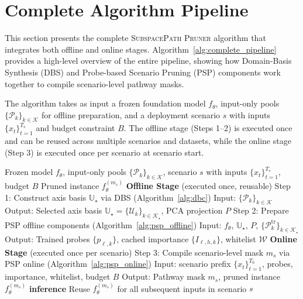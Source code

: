 \section{Complete Algorithm Pipeline}
\label{app:complete_pipeline}

This section presents the complete \textsc{SubspacePath Pruner} algorithm that integrates both offline and online stages.
Algorithm~\ref{alg:complete_pipeline} provides a high-level overview of the entire pipeline, showing how Domain-Basis Synthesis (DBS) and Probe-based Scenario Pruning (PSP) components work together to compile scenario-level pathway masks.

The algorithm takes as input a frozen foundation model $f_\theta$, input-only pools $\{\mathcal{P}_k\}_{k\in\mathcal{K}}$ for offline preparation, and a deployment scenario $s$ with inputs $\{x_t\}_{t=1}^{T_s}$ and budget constraint $B$.
The offline stage (Steps 1--2) is executed once and can be reused across multiple scenarios and datasets, while the online stage (Step 3) is executed once per scenario at scenario start.

\begin{algorithm*}[!b]
\caption{SubspacePath Pruner: Complete Pipeline}
\label{alg:complete_pipeline}
\begin{algorithmic}[1]
\REQUIRE Frozen model $f_\theta$, input-only pools $\{\mathcal{P}_k\}_{k\in\mathcal{K}}$, scenario $s$ with inputs $\{x_t\}_{t=1}^{T_s}$, budget $B$
\ENSURE Pruned instance $f_{\theta}^{(m_s)}$
\STATE \textbf{Offline Stage} (executed once, reusable)
\STATE \quad Step 1: Construct axis basis $\mathbb{U}_\star$ via DBS (Algorithm~\ref{alg:dbc})
\STATE \quad \quad Input: $\{\mathcal{P}_k\}_{k\in\mathcal{K}}$
\STATE \quad \quad Output: Selected axis basis $\mathbb{U}_\star = \{\mathcal{U}_k\}_{k\in\mathcal{K}_\star}$, PCA projection $P$
\STATE \quad Step 2: Prepare PSP offline components (Algorithm~\ref{alg:psp_offline})
\STATE \quad \quad Input: $f_\theta$, $\mathbb{U}_\star$, $P$, $\{\mathcal{P}_k^{\mathrm{tr}}\}_{k\in\mathcal{K}_\star}$
\STATE \quad \quad Output: Trained probes $\{p_{\ell,k}\}$, cached importance $\{I_{\ell,h,k}\}$, whitelist $\mathcal{W}$
\STATE \textbf{Online Stage} (executed once per scenario)
\STATE \quad Step 3: Compile scenario-level mask $m_s$ via PSP online (Algorithm~\ref{alg:psp_online})
\STATE \quad \quad Input: scenario prefix $\{x_t\}_{t=1}^{T_0}$, probes, importance, whitelist, budget $B$
\STATE \quad \quad Output: Pathway mask $m_s$, pruned instance $f_{\theta}^{(m_s)}$
\STATE \textbf{inference}
\STATE \quad Reuse $f_{\theta}^{(m_s)}$ for all subsequent inputs in scenario $s$
\end{algorithmic}
\end{algorithm*}

